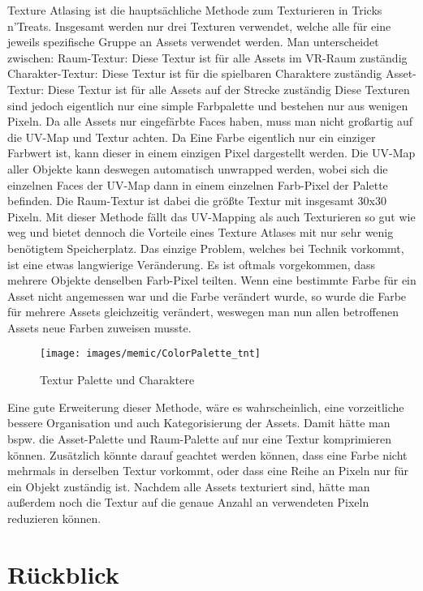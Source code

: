 Texture Atlasing ist die hauptsächliche Methode zum Texturieren in Tricks n’Treats. Insgesamt werden nur drei Texturen verwendet, welche alle für eine jeweils spezifische Gruppe an Assets verwendet werden. 
Man unterscheidet zwischen:
Raum-Textur: Diese Textur ist für alle Assets im VR-Raum zuständig
Charakter-Textur: Diese Textur ist für die spielbaren Charaktere zuständig
Asset-Textur: Diese Textur ist für alle Assets auf der Strecke zuständig
Diese Texturen sind jedoch eigentlich nur eine simple Farbpalette und bestehen nur aus wenigen Pixeln. Da alle Assets nur eingefärbte Faces haben, muss man nicht großartig auf die UV-Map und Textur achten. Da Eine Farbe eigentlich nur ein einziger Farbwert ist, kann dieser in einem einzigen Pixel dargestellt werden. Die UV-Map aller Objekte kann deswegen automatisch unwrapped werden, wobei sich die einzelnen Faces der UV-Map dann in einem einzelnen Farb-Pixel der Palette befinden. Die Raum-Textur ist dabei die größte Textur mit insgesamt 30x30 Pixeln.
Mit dieser Methode fällt das UV-Mapping als auch Texturieren so gut wie weg und bietet dennoch die Vorteile eines Texture Atlases mit nur sehr wenig benötigtem Speicherplatz. Das einzige Problem, welches bei Technik vorkommt, ist eine etwas langwierige Veränderung. Es ist oftmals vorgekommen, dass mehrere Objekte denselben Farb-Pixel teilten. Wenn eine bestimmte Farbe für ein Asset nicht angemessen war und die Farbe verändert wurde, so wurde die Farbe für mehrere Assets gleichzeitig verändert, weswegen man nun allen betroffenen Assets neue Farben zuweisen musste.
\begin{figure}[H]
	\centering
	\texttt{[image: images/memic/ColorPalette\_tnt]}
	\caption{Textur Palette und Charaktere}
\end{figure}
Eine gute Erweiterung dieser Methode, wäre es wahrscheinlich, eine vorzeitliche bessere Organisation und auch Kategorisierung der Assets. Damit hätte man bspw. die Asset-Palette und Raum-Palette auf nur eine Textur komprimieren können. Zusätzlich könnte darauf geachtet werden können, dass eine Farbe nicht mehrmals in derselben Textur vorkommt, oder dass eine Reihe an Pixeln nur für ein Objekt zuständig ist. Nachdem alle Assets texturiert sind, hätte man außerdem noch die Textur auf die genaue Anzahl an verwendeten Pixeln reduzieren können.

\section{Rückblick}

